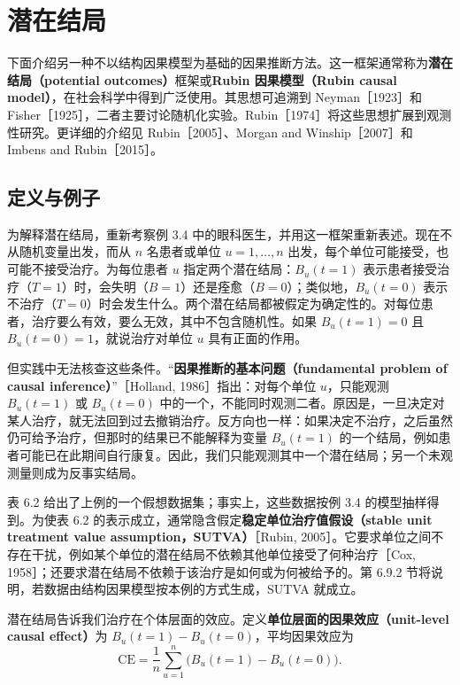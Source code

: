 \section{潜在结局}
\label{sec:ch06-potential-outcomes}

下面介绍另一种不以结构因果模型为基础的因果推断方法。这一框架通常称为\textbf{潜在结局（potential outcomes）}框架或\textbf{Rubin 因果模型（Rubin causal model）}，在社会科学中得到广泛使用。其思想可追溯到 Neyman［1923］和 Fisher［1925］，二者主要讨论随机化实验。Rubin［1974］将这些思想扩展到观测性研究。更详细的介绍见 Rubin［2005］、Morgan and Winship［2007］和 Imbens and Rubin［2015］。

\subsection{定义与例子}

为解释潜在结局，重新考察例 3.4 中的眼科医生，并用这一框架重新表述。现在不从随机变量出发，而从 $n$ 名患者或单位 $u=1,\ldots,n$ 出发，每个单位可能接受，也可能不接受治疗。为每位患者 $u$ 指定两个潜在结局：$B_u(t=1)$ 表示患者接受治疗（$T=1$）时，会失明（$B=1$）还是痊愈（$B=0$）；类似地，$B_u(t=0)$ 表示不治疗（$T=0$）时会发生什么。两个潜在结局都被假定为确定性的。对每位患者，治疗要么有效，要么无效，其中不包含随机性。如果 $B_u(t=1)=0$ 且 $B_u(t=0)=1$，就说治疗对单位 $u$ 具有正面的作用。

但实践中无法核查这些条件。“\textbf{因果推断的基本问题（fundamental problem of causal inference）}”［Holland, 1986］指出：对每个单位 $u$，只能观测 $B_u(t=1)$ 或 $B_u(t=0)$ 中的一个，不能同时观测二者。原因是，一旦决定对某人治疗，就无法回到过去撤销治疗。反方向也一样：如果决定不治疗，之后虽然仍可给予治疗，但那时的结果已不能解释为变量 $B_u(t=1)$ 的一个结局，例如患者可能已在此期间自行康复。因此，我们只能观测其中一个潜在结局；另一个未观测量则成为反事实结局。

表 6.2 给出了上例的一个假想数据集；事实上，这些数据按例 3.4 的模型抽样得到。为使表 6.2 的表示成立，通常隐含假定\textbf{稳定单位治疗值假设（stable unit treatment value assumption，SUTVA）}［Rubin, 2005］。它要求单位之间不存在干扰，例如某个单位的潜在结局不依赖其他单位接受了何种治疗［Cox, 1958］；还要求潜在结局不依赖于该治疗是如何或为何被给予的。第 6.9.2 节将说明，若数据由结构因果模型按本例的方式生成，SUTVA 就成立。

潜在结局告诉我们治疗在个体层面的效应。定义\textbf{单位层面的因果效应（unit-level causal effect）}为 $B_u(t=1)-B_u(t=0)$，平均因果效应为
\begin{equation}
 \mathrm{CE}=\frac1n\sum_{u=1}^n
 \bigl(B_u(t=1)-B_u(t=0)\bigr).
 \tag{6.25}
\end{equation}


